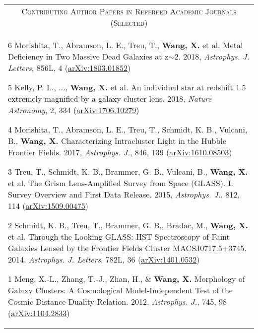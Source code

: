 \documentclass[letterpaper,11pt]{article}
\newcommand{\narrow}{-1.8ex}
\begin{document}
\begin{longtable}{p{6.5in}}
\\[\narrow]
\multicolumn{1}{c}{\textsc{Contributing Author Papers in Refereed Academic Journals (Selected)}}      \\
\vspace{-.5em}
\begin{list}{}{\leftmargin=1em}
    \item[6]\hypertarget{}{} Morishita, T., Abramson, L. E., Treu, T., \textbf{Wang, X.} et al.  Metal Deficiency in Two Massive Dead Galaxies at z$\sim$2. 2018, \textit{Astrophys. J. Letters}, 856L, 4 (\href{https://arxiv.org/abs/1803.01852}{arXiv:1803.01852})
    \item[5]\hypertarget{}{} Kelly, P. L., ..., \textbf{Wang, X.} et al. An individual star at redshift 1.5 
    extremely magnified by a galaxy-cluster lens. 2018, \textit{Nature Astronomy}, 2, 334 (\href{https://arxiv.org/abs/1706.10279}{arXiv:1706.10279})
    \item[4]\hypertarget{}{} Morishita, T., Abramson, L. E., Treu, T., Schmidt, K. B., Vulcani, B., \textbf{Wang, X.} Characterizing Intracluster Light in the Hubble Frontier Fields. 2017, \textit{Astrophys. J.}, 846, 139 (\href{https://arxiv.org/abs/1610.08503}{arXiv:1610.08503})
    \item[3]\hypertarget{}{} Treu, T., Schmidt, K. B., Brammer, G. B., Vulcani, B., \textbf{Wang, X.} et al. The Grism Lens-Amplified Survey from Space (GLASS). I. Survey Overview and First Data Release. 2015, \textit{Astrophys. J.}, 812, 114 (\href{https://arxiv.org/abs/1509.00475}{arXiv:1509.00475})
    \item[2]\hypertarget{14.schmidt.apjl}{} Schmidt, K. B., Treu, T., Brammer, G. B., Bradac, M., \textbf{Wang, X.} et al. Through the Looking GLASS: HST Spectroscopy of Faint Galaxies Lensed by the Frontier Fields Cluster MACSJ0717.5+3745. 2014, \textit{Astrophys. J. Letters}, 782L, 36 (\href{http://arxiv.org/abs/1401.0532}{arXiv:1401.0532})
    \item[1]\hypertarget{12.meng.apj}{} Meng, X.-L., Zhang, T.-J., Zhan, H., \& \textbf{Wang, X.} Morphology of Galaxy Clusters: A Cosmological Model-Independent Test of the Cosmic Distance-Duality Relation. 2012, \textit{Astrophys. J.}, 745, 98 (\href{http://arxiv.org/abs/1104.2833}{arXiv:1104.2833})
\end{list}

\end{longtable}
\end{document}
